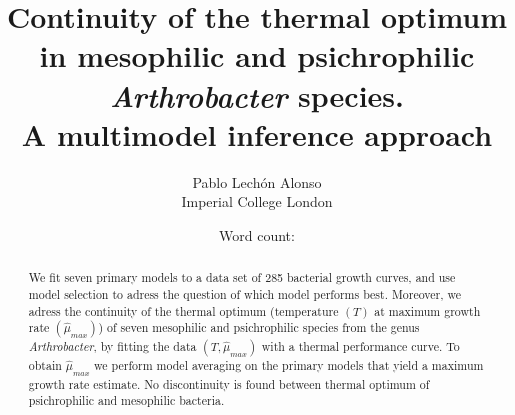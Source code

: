 \documentclass[titlepage,11pt]{article}
\newcommand{\wordcount}{} %
\begin{document}
	\title{Continuity of the thermal optimum in mesophilic and psichrophilic \textit{Arthrobacter} species.\\
		 A multimodel inference approach }
	\author{Pablo Lechón Alonso \\ 
				Imperial College London}
	\date{Word count: \wordcount}%
	\maketitle
	

	\begin{abstract}
		We fit seven primary models to a data set of 285 bacterial growth curves, and use model selection to adress the question of which model performs best. Moreover, we adress the continuity of the thermal optimum (temperature $ (T) $ at maximum growth rate $ (\hat{\mu}_{max} )$) of seven mesophilic and psichrophilic species from the genus \textit{Arthrobacter}, by fitting the data $ (T, \hat{\mu}_{max}) $ with a thermal performance curve. To obtain $\hat{\mu}_{max}$ we perform model averaging on the primary models that yield a maximum growth rate estimate. No discontinuity is found between thermal optimum of psichrophilic and mesophilic bacteria. 
	\end{abstract}

	\tableofcontents
	\newpage
	
\end{document}
